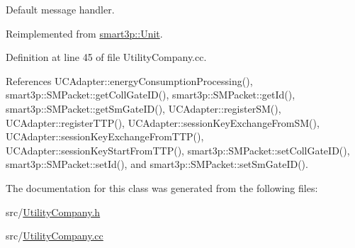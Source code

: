 Default message handler. 



Reimplemented from \hyperlink{classsmart3p_1_1Unit_a93f16f43dec69d23d8588f3b60c96d69}{smart3p\+::\+Unit}.



Definition at line 45 of file Utility\+Company.\+cc.



References U\+C\+Adapter\+::energy\+Consumption\+Processing(), smart3p\+::\+S\+M\+Packet\+::get\+Coll\+Gate\+I\+D(), smart3p\+::\+S\+M\+Packet\+::get\+Id(), smart3p\+::\+S\+M\+Packet\+::get\+Sm\+Gate\+I\+D(), U\+C\+Adapter\+::register\+S\+M(), U\+C\+Adapter\+::register\+T\+T\+P(), U\+C\+Adapter\+::session\+Key\+Exchange\+From\+S\+M(), U\+C\+Adapter\+::session\+Key\+Exchange\+From\+T\+T\+P(), U\+C\+Adapter\+::session\+Key\+Start\+From\+T\+T\+P(), smart3p\+::\+S\+M\+Packet\+::set\+Coll\+Gate\+I\+D(), smart3p\+::\+S\+M\+Packet\+::set\+Id(), and smart3p\+::\+S\+M\+Packet\+::set\+Sm\+Gate\+I\+D().



The documentation for this class was generated from the following files\+:\begin{DoxyCompactItemize}
\item 
src/\hyperlink{UtilityCompany_8h}{Utility\+Company.\+h}\item 
src/\hyperlink{UtilityCompany_8cc}{Utility\+Company.\+cc}\end{DoxyCompactItemize}
